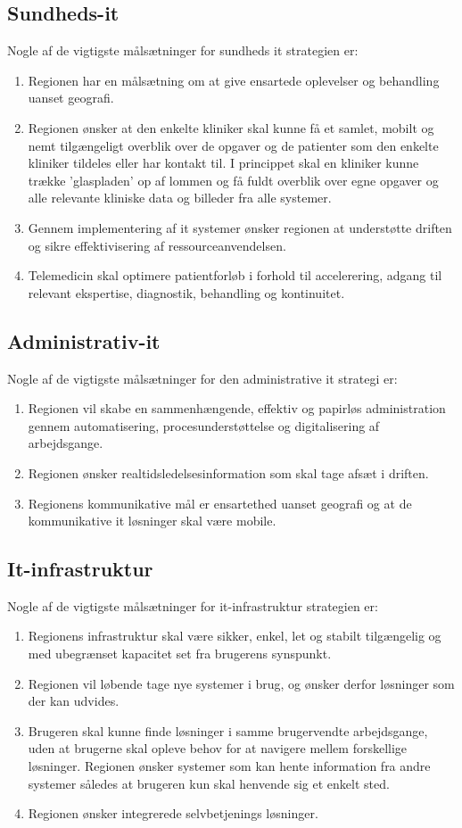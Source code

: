\subsection{Sundheds-it}
Nogle af de vigtigste målsætninger for sundheds it strategien er:
\begin{enumerate}
	\item Regionen har en målsætning om at give ensartede oplevelser og behandling uanset geografi.
	\item Regionen ønsker at den enkelte kliniker skal kunne få et samlet, mobilt og nemt tilgængeligt overblik over de opgaver og de patienter som den enkelte kliniker tildeles eller har kontakt til. I princippet skal en kliniker kunne
	trække 'glaspladen' op af lommen og få fuldt overblik over egne opgaver og alle relevante kliniske data og billeder fra alle systemer.
	\item Gennem implementering af it systemer ønsker regionen at understøtte driften og sikre effektivisering af ressourceanvendelsen.
	\item Telemedicin skal optimere patientforløb i forhold til accelerering, adgang til relevant ekspertise, diagnostik, behandling og kontinuitet. 
\end{enumerate}
\subsection{Administrativ-it}
Nogle af de vigtigste målsætninger for den administrative it strategi er:
\begin{enumerate}
	\item Regionen vil skabe en sammenhængende, effektiv og papirløs administration gennem automatisering, procesunderstøttelse og digitalisering af arbejdsgange.
	\item Regionen ønsker realtidsledelsesinformation som skal tage afsæt i driften.
	\item Regionens kommunikative mål er ensartethed uanset geografi og at de kommunikative it løsninger skal være mobile.
\end{enumerate}
\subsection{It-infrastruktur}
Nogle af de vigtigste målsætninger for it-infrastruktur strategien er:
\begin{enumerate}
	\item Regionens infrastruktur skal være sikker, enkel, let og stabilt tilgængelig og med ubegrænset kapacitet set fra brugerens synspunkt.
	\item Regionen vil løbende tage nye systemer i brug, og ønsker derfor løsninger som der kan udvides.
	\item Brugeren skal kunne finde løsninger i samme brugervendte arbejdsgange, uden at brugerne skal opleve behov for at navigere mellem forskellige løsninger. Regionen ønsker systemer som kan hente information fra andre systemer således at brugeren kun skal henvende sig et enkelt sted.
	\item Regionen ønsker integrerede selvbetjenings løsninger.
\end{enumerate}



